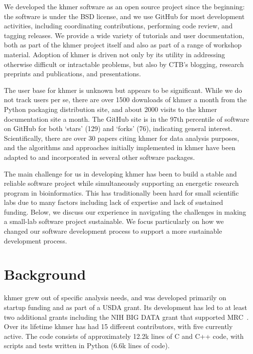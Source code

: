 \documentclass[12pt]{article}
\begin{document}
We developed the khmer software as an open source project since the
beginning: the software is under the BSD license, and we use GitHub
for most development activities, including coordinating contributions,
performing code review, and tagging releases.  We provide a wide
variety of tutorials and user documentation, both as part of the khmer
project itself and also as part of a range of workshop material.
Adoption of khmer is driven not only by its utility in addressing
otherwise difficult or intractable problems, but also by CTB's
blogging, research preprints and publications, and presentations.

The user base for khmer is unknown but appears to be significant.
While we do not track users per se, there are over 1500 downloads of
khmer a month from the Python packaging distribution site, and about
2000 visits to the khmer documentation site a month.  The GitHub site
is in the 97th percentile of software on GitHub for both `stars' (129)
and `forks' (76), indicating general interest.  Scientifically, there
are over 30 papers citing khmer for data analysis purposes, and the
algorithms and approaches initially implemented in khmer have been
adapted to and incorporated in several other software packages.

The main challenge for us in developing khmer has been to build a
stable and reliable software project while simultaneously supporting
an energetic research program in bioinformatics.  This has
traditionally been hard for small scientific labs due to many factors
including lack of expertise and lack of sustained funding.  Below, we
discuss our experience in navigating the challenges in making a
small-lab software project sustainable.  We focus particularly on how
we changed our software development process to support a more
sustainable development process.

\section{Background}

khmer grew out of specific analysis needs, and was developed primarily
on startup funding and as part of a USDA grant.  Its development has
led to at least two additional grants including the NIH BIG DATA
grant that supported MRC~\cite{brown2012bigdata}.  Over its lifetime
khmer has had 15 different contributors, with five currently active.
The code consists of approximately 12.2k lines of C and C++ code, with
scripts and tests written in Python (6.6k lines of code).
\end{document}
